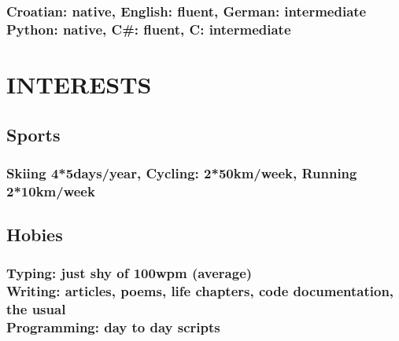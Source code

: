 \documentclass{article}
\begin{document}
\subsubsection{Croatian: native, English: fluent, German: intermediate
	\\Python: native, C\#: fluent, C: intermediate}

\section{INTERESTS}
\subsection{Sports}
\subsubsection{Skiing 4*5days/year, Cycling: 2*50km/week, Running 2*10km/week}
\subsection{Hobies}
\subsubsection{Typing: just shy of 100wpm (average)
	\\Writing: articles, poems, life chapters, code documentation, the usual
	\\Programming: day to day scripts}
\end{document}
